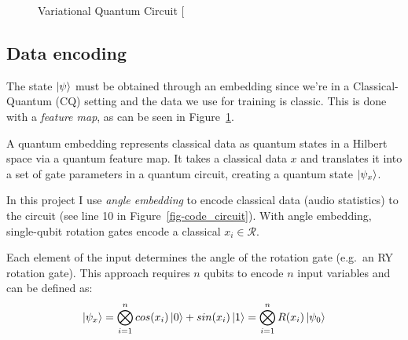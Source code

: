 \documentclass[
  13pt,
  a4paper,
  DIV=11,
  numbers=noendperiod]{scrreprt}
\begin{document}
\begin{figure}


\caption{\label{fig-vqc}Variational Quantum Circuit
{[}\citeproc{ref-vqc_tut}{2}{]}}

\end{figure}%

\subsection{Data encoding}\label{data-encoding}

The state \(\ket{\psi}\) must be obtained through an embedding since
we're in a Classical-Quantum (CQ) setting and the data we use for
training is classic. This is done with a \emph{feature map}, as can be
seen in Figure~\ref{fig-vqc}.

A quantum embedding represents classical data as quantum states in a
Hilbert space via a quantum feature map. It takes a classical data \(x\)
and translates it into a set of gate parameters in a quantum circuit,
creating a quantum state \(\ket{\psi_x}\).

In this project I use \emph{angle embedding} to encode classical data
(audio statistics) to the circuit (see line 10 in
Figure~\ref{fig-code_circuit}). With angle embedding, single-qubit
rotation gates encode a classical \(x_i \in \mathcal{R}\).

Each element of the input determines the angle of the rotation gate
(e.g.~an RY rotation gate). This approach requires \(n\) qubits to
encode \(n\) input variables and can be defined as: \[
\ket{\psi_x} = \bigotimes_{i=1}^n cos(x_i) \ket{0} + sin(x_i)\ket{1} = \bigotimes_{i=1}^n R(x_i)\ket{\psi_0}
\]
\end{document}
